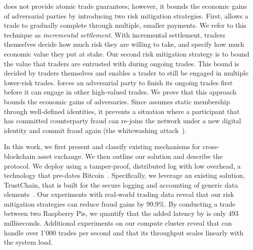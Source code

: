 \ModelName{} does not provide atomic trade guarantees; however, it bounds the economic gains of adversarial parties by introducing two risk mitigation strategies.
First, \ModelName{} allows a trade to gradually complete through multiple, smaller payments.
We refer to this technique as \emph{incremental settlement}.
With incremental settlement, traders themselves decide how much risk they are willing to take, and specify how much economic value they put at stake.
Our second risk mitigation strategy is to bound the value that traders are entrusted with during ongoing trades.
This bound is decided by traders themselves and enables a trader to still be engaged in multiple lower-risk trades.
\ModelName{} forces an adversarial party to finish its ongoing trades first before it can engage in other high-valued trades.
We prove that this approach bounds the economic gains of adversaries.
Since \ModelName{} assumes static membership through well-defined identities, it prevents a situation where a participant that has committed counterparty fraud can re-joins the network under a new digital identity and commit fraud again (the whitewashing attack~\cite{feldman2006free}).

In this work, we first present and classify existing mechanisms for cross-blockchain asset exchange.
We then outline our solution and describe the \ModelName{} protocol.
We deploy \ModelName{} using a tamper-proof, distributed log with low overhead, a technology that pre-dates Bitcoin~\cite{haeberlen2007peerreview}.
Specifically, we leverage an existing solution, TrustChain, that is built for the secure logging and accounting of generic data elements~\cite{otte2017trustchain}.
Our experiments with real-world trading data reveal that our risk mitigation strategies can reduce fraud gains by 99.9\%.
By conducting a trade between two Raspberry Pis, we quantify that the added latency by \ModelName{} is only 493 milliseconds.
Additional experiments on our compute cluster reveal that \ModelName{} can handle over 1'000 trades per second and that its throughput scales linearly with the system load.

